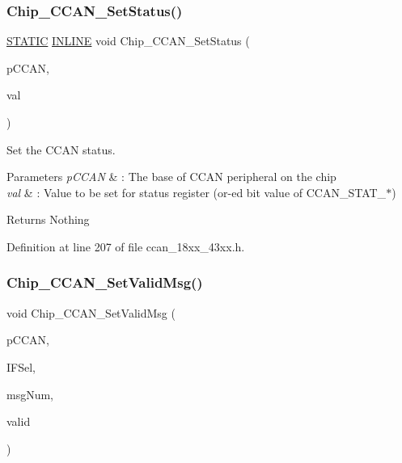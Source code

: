 \subsubsection{\texorpdfstring{Chip\+\_\+\+C\+C\+A\+N\+\_\+\+Set\+Status()}{Chip\_CCAN\_SetStatus()}}
{\footnotesize\ttfamily \hyperlink{group___l_p_c___types___public___macros_ga10b2d890d871e1489bb02b7e70d9bdfb}{S\+T\+A\+T\+IC} \hyperlink{spifi__18xx__43xx_8h_a2eb6f9e0395b47b8d5e3eeae4fe0c116}{I\+N\+L\+I\+NE} void Chip\+\_\+\+C\+C\+A\+N\+\_\+\+Set\+Status (\begin{DoxyParamCaption}\item[{\hyperlink{struct_l_p_c___c_c_a_n___t}{L\+P\+C\+\_\+\+C\+C\+A\+N\+\_\+T} $\ast$}]{p\+C\+C\+AN,  }\item[{uint32\+\_\+t}]{val }\end{DoxyParamCaption})}



Set the C\+C\+AN status. 


\begin{DoxyParams}{Parameters}
{\em p\+C\+C\+AN} & \+: The base of C\+C\+AN peripheral on the chip \\
\hline
{\em val} & \+: Value to be set for status register (or-\/ed bit value of C\+C\+A\+N\+\_\+\+S\+T\+A\+T\+\_\+$\ast$) \\
\hline
\end{DoxyParams}
\begin{DoxyReturn}{Returns}
Nothing 
\end{DoxyReturn}


Definition at line 207 of file ccan\+\_\+18xx\+\_\+43xx.\+h.

\mbox{\label{group___c_c_a_n__18_x_x__43_x_x_ga3418e9cdab81c5c8d7fb18d4afa0bd6e}} 
\subsubsection{\texorpdfstring{Chip\+\_\+\+C\+C\+A\+N\+\_\+\+Set\+Valid\+Msg()}{Chip\_CCAN\_SetValidMsg()}}
{\footnotesize\ttfamily void Chip\+\_\+\+C\+C\+A\+N\+\_\+\+Set\+Valid\+Msg (\begin{DoxyParamCaption}\item[{\hyperlink{struct_l_p_c___c_c_a_n___t}{L\+P\+C\+\_\+\+C\+C\+A\+N\+\_\+T} $\ast$}]{p\+C\+C\+AN,  }\item[{\hyperlink{group___c_c_a_n__18_x_x__43_x_x_gac90da0138c430750d2d7d55d4448cae7}{C\+C\+A\+N\+\_\+\+M\+S\+G\+\_\+\+I\+F\+\_\+T}}]{I\+F\+Sel,  }\item[{uint8\+\_\+t}]{msg\+Num,  }\item[{bool}]{valid }\end{DoxyParamCaption})}



